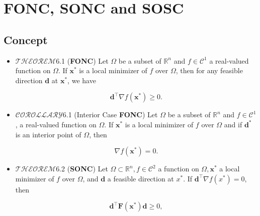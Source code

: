 \section{FONC, SONC and SOSC}

\subsection{Concept}

\begin{itemize}
	\item \(\mathscr{THEOREM}\)6.1 (\textbf{FONC}) Let \(\Omega\) be a subset of \(\mathbb{R}^{n}\) and \(f \in \mathcal{C}^{1}\) a real-valued function on \(\Omega\). If \(\boldsymbol{x}^{*}\) is a local minimizer of \(f\) over \(\Omega\), then for any feasible direction \(\boldsymbol{d}\) at \(\boldsymbol{x}^{*}\), we have
	
	\begin{equation*}
		\boldsymbol{d}^{\top} \nabla f\left(\boldsymbol{x}^{*}\right) \geq 0.
	\end{equation*}

	\item \(\mathscr{COROLLARY}\)6.1 (Interior Case \textbf{FONC}) Let \(\Omega\) be a subset of \(\mathbb{R}^{n}\) and \(f \in \mathcal{C}^{1}\), a real-valued function on \(\Omega\). If \(\boldsymbol{x}^{*}\) is a local minimizer of \(f\) over \(\Omega\) and if \(\boldsymbol{d}^{*}\) is an interior point of \(\Omega\), then
	
	\begin{equation*}
		\nabla f\left(\boldsymbol{x}^{*}\right)=0 .
	\end{equation*}

	\item \(\mathscr{THEOREM}\)6.2 (\textbf{SONC}) Let \(\Omega \subset \mathbb{R}^{n}, f \in \mathcal{C}^{2}\) a function on \(\Omega, \boldsymbol{x}^{*}\) a local minimizer of \(f\) over \(\Omega\), and \(\boldsymbol{d}\) a feasible direction at \(x^{*}\). If \(\boldsymbol{d}^{\top} \nabla f\left(x^{*}\right)=0\), then
	
	\begin{equation*}
		\boldsymbol{d}^{\top} \boldsymbol{F} \left(\boldsymbol{x}^{*}\right) \boldsymbol{d} \geq 0,
	\end{equation*}
	

\end{itemize}

